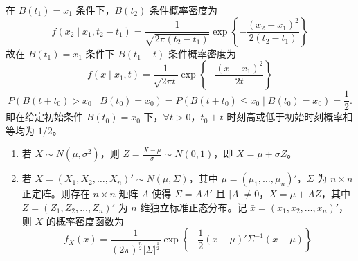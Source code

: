 \documentclass[lang=cn,10pt,thmcnt=section]{elegantbook}
\begin{document}
\begin{remark}

	在 $B(t_1) = x_1$ 条件下，$B(t_2)$ 条件概率密度为
\[
f(x_2 \mid x_1, t_2 - t_1) = \frac{1}{\sqrt{2\pi(t_2 - t_1)}} \exp\left\{-\frac{(x_2 - x_1)^2}{2(t_2 - t_1)}\right\}
\]
故在 $B(t_1) = x_1$ 条件下 $B(t_1 + t)$ 条件概率密度为
\[
f(x \mid x_1, t) = \frac{1}{\sqrt{2\pi t}} \exp\left\{-\frac{(x - x_1)^2}{2t}\right\}
\]
\[
P(B(t + t_0) > x_0 \mid B(t_0) = x_0) = P(B(t + t_0) \leq x_0 \mid B(t_0) = x_0) = \frac{1}{2}.
\]
即在给定初始条件 $B(t_0) = x_0$ 下，$\forall t > 0$，$t_0 + t$ 时刻高或低于初始时刻概率相等均为 $1/2$。
\end{remark}

\begin{enumerate}
    \item 若 $X \sim N(\mu, \sigma^2)$，则 $Z = \frac{X - \mu}{\sigma} \sim N(0, 1)$，即 $X = \mu + \sigma Z$。
    \item 若 $X = (X_1, X_2, \ldots, X_n)' \sim N(\bar{\mu}, \Sigma)$，其中 $\bar{\mu} = (\mu_1, \ldots, \mu_n)'$，$\Sigma$ 为 $n \times n$ 正定阵。则存在 $n \times n$ 矩阵 $A$ 使得 $\Sigma = AA'$ 且 $|A| \neq 0$，$X = \bar{\mu} + AZ$，其中 $Z = (Z_1, Z_2, \ldots, Z_n)'$ 为 $n$ 维独立标准正态分布。记 $\bar{x} = (x_1, x_2, \ldots, x_n)'$，则 $X$ 的概率密度函数为
    \[
    f_X(\bar{x}) = \frac{1}{(2\pi)^{\frac{n}{2}} |\Sigma|^{\frac{1}{2}}} \exp\left\{-\frac{1}{2}(\bar{x} - \bar{\mu})' \Sigma^{-1} (\bar{x} - \bar{\mu})\right\}
    \]
\end{enumerate}
\end{document}
